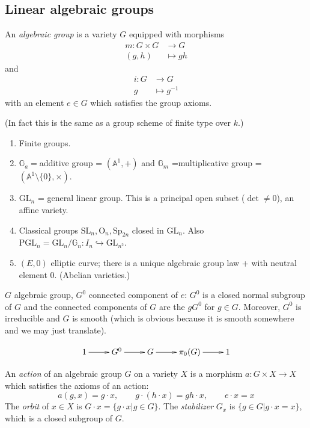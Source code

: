 \subsection*{Linear algebraic groups}
\label{subsection-linear-algebraic-groups}
\begin{definition}
\label{definition-algebraic-group}
An {\it algebraic group} is a variety $G$ equipped with morphisms
\begin{align*}
m: G\times G &\longrightarrow G \\
(g,h) &\longmapsto gh
\end{align*}
and
\begin{align*}
i: G &\longrightarrow G \\
g &\longmapsto g^{-1}
\end{align*}
with an element $e \in G$ which satisfies the group axioms.
\end{definition}

(In fact this is the same as a group scheme of finite type over $k$.)

\begin{example}
\label{example-algebraic-groups}
\begin{enumerate}
\item Finite groups.
\item $\mathbb{G}_a=$additive group = $(\mathbb{A}^1,+)$ and $\mathbb{G}_m$
=multiplicative group = $(\mathbb{A}^1\setminus\{0\},\times)$.
\item $\text{GL}_n$ = general linear group. This is a principal open subset
($\det \neq 0$), an affine variety.
\item Classical groups $\text{SL}_n,\text{O}_n,\text{Sp}_{2n}$ closed in 
$\text{GL}_n$. Also 
$\text{PGL}_n=\text{GL}_n/\mathbb{G}_n:I_n\hookrightarrow\text{GL}_{n^2}$.
\item $(E,0)$ elliptic curve; there is a unique algebraic group law + with
neutral element $0$. (Abelian varieties.)
\end{enumerate}
\end{example}

\begin{proposition}
\label{proposition-connected-components-of-algebraic-group}
$G$ algebraic group, $G^0$ connected component of $e$: $G^0$ is a closed normal
subgroup of $G$ and the connected components of $G$ are the $gG^0$ for $g \in
G$. Moreover, $G^0$ is irreducible and $G$ is smooth (which is obvious because
it is smooth somewhere and we may just translate).
\end{proposition}
$$
\xymatrix{
1\ar[r]&G^0\ar[r]&G\ar[r]&\pi_0(G)\ar[r]&1
}
$$
\begin{definition}
\label{definition-action-of-algebraic-group}
An {\it action} of an algebraic group $G$ on a variety $X$ is a morphism $a:G
\times X \to X$ which satisfies the axioms of an action:
$$
a(g,x)=g\cdot x,\qquad  g\cdot(h\cdot x)=gh\cdot x,\qquad  e\cdot x=x
$$
The {\it orbit} of $x \in X$ is $G\cdot x=\{g\cdot x|g \in G\}$. The {\it
stabilizer} $G_x$ is $\{g \in G|g\cdot x=x\}$, which is a closed subgroup of
$G$.
\end{definition}

